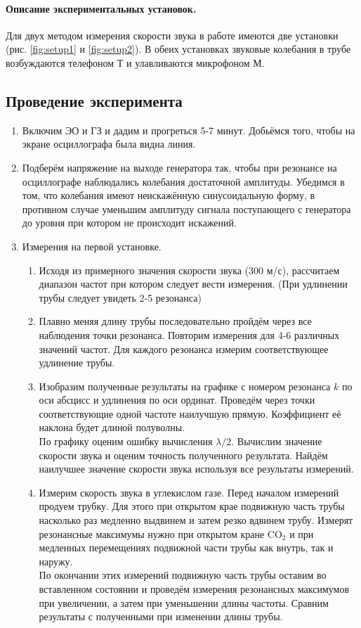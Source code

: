 \documentclass[a4paper,12pt]{article} %
\begin{document}
\paragraph{Описание экспериментальных установок.} Для двух методом измерения скорости звука в работе имеются две установки (рис. \ref{fig:setup1} и \ref{fig:setup2}). В обеих установках звуковые колебания в трубе возбуждаются телефоном Т и улавливаются микрофоном М. 



\subsection{Проведение эксперимента}

\begin{enumerate}
\itemsep0em
\renewcommand{\labelenumii}{\alph{enumii})}

\item Включим ЭО и ГЗ и дадим и прогреться 5-7 минут. Добьёмся того, чтобы на экране осциллографа была видна линия.
\item Подберём напряжение на выходе генератора так, чтобы при резонансе на осциллографе наблюдались колебания достаточной амплитуды. Убедимся в том, что колебания имеют неискажённую синусоидальную форму, в противном случае уменьшим амплитуду сигнала поступающего с генератора до уровня при котором не происходит искажений. 
\item Измерения на первой установке.
\begin{enumerate}

\item Исходя из примерного значения скорости звука (300 м/с), рассчитаем диапазон частот при котором следует вести измерения. (При удлинении трубы следует увидеть 2-5 резонанса)
\item Плавно меняя длину трубы последовательно пройдём через все наблюдения точки резонанса. Повторим измерения для 4-6 различных значений частот. Для каждого резонанса измерим соответствующее удлинение трубы. 
\item Изобразим полученные результаты на графике с номером резонанса $k$ по оси абсцисс и удлинения по оси ординат. Проведём через точки соответствующие одной частоте наилучшую прямую. Коэффициент её наклона будет длиной полуволны.\\
По графику оценим ошибку вычисления $\lambda / 2$. Вычислим значение скорости звука и оценим точность полученного результата. Найдём наилучшее значение скорости звука используя все результаты измерений.
\item Измерим скорость звука в углекислом газе. Перед началом измерений продуем трубку. Для этого при открытом крае подвижную часть трубы насколько раз медленно выдвинем и затем резко вдвинем трубу. Измерят резонансные максимумы нужно при открытом кране $\text{CO}_2$ и при медленных перемещениях подвижной части трубы как внутрь, так и наружу. \\
По окончании этих измерений подвижную часть трубы оставим во вставленном состоянии и проведём измерения резонансных максимумов при увеличении, а затем при уменьшении длины частоты. Сравним результаты с полученными при изменении длины трубы.
\end{enumerate}


\end{enumerate}
\end{document}
